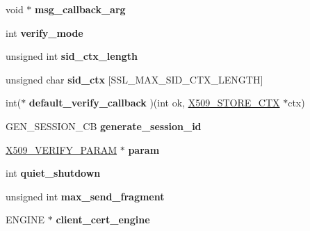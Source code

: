 \begin{DoxyCompactItemize}
\item 
\mbox{\label{structssl__ctx__st_ad1aba043a97ea40fcb8a39e65698f8c0}} 
void $\ast$ {\bfseries msg\+\_\+callback\+\_\+arg}
\item 
\mbox{\label{structssl__ctx__st_a31f82e30439244c12f51daff24fd40d8}} 
int {\bfseries verify\+\_\+mode}
\item 
\mbox{\label{structssl__ctx__st_a59afab8285fbc901d590ab6edaa75bd0}} 
unsigned int {\bfseries sid\+\_\+ctx\+\_\+length}
\item 
\mbox{\label{structssl__ctx__st_a92f94c2a4612e04ec3c075c76aae5553}} 
unsigned char {\bfseries sid\+\_\+ctx} \mbox{[}S\+S\+L\+\_\+\+M\+A\+X\+\_\+\+S\+I\+D\+\_\+\+C\+T\+X\+\_\+\+L\+E\+N\+G\+TH\mbox{]}
\item 
\mbox{\label{structssl__ctx__st_aa6c4ede4479002d346cee1bb1be14a46}} 
int($\ast$ {\bfseries default\+\_\+verify\+\_\+callback} )(int ok, \hyperlink{structx509__store__ctx__st}{X509\+\_\+\+S\+T\+O\+R\+E\+\_\+\+C\+TX} $\ast$ctx)
\item 
\mbox{\label{structssl__ctx__st_a4485f799f50830d69fa26e7514b032dc}} 
G\+E\+N\+\_\+\+S\+E\+S\+S\+I\+O\+N\+\_\+\+CB {\bfseries generate\+\_\+session\+\_\+id}
\item 
\mbox{\label{structssl__ctx__st_a27c15c2ea4e216baacb44a5bf166cfa1}} 
\hyperlink{struct_x509___v_e_r_i_f_y___p_a_r_a_m__st}{X509\+\_\+\+V\+E\+R\+I\+F\+Y\+\_\+\+P\+A\+R\+AM} $\ast$ {\bfseries param}
\item 
\mbox{\label{structssl__ctx__st_a325f28f265dae1b20da7c813e41bdb96}} 
int {\bfseries quiet\+\_\+shutdown}
\item 
\mbox{\label{structssl__ctx__st_aab1f54a0e69246d749a6f6ad249c2176}} 
unsigned int {\bfseries max\+\_\+send\+\_\+fragment}
\item 
\mbox{\label{structssl__ctx__st_ae6bb617a63017d5c8e7eccc6f8030185}} 
E\+N\+G\+I\+NE $\ast$ {\bfseries client\+\_\+cert\+\_\+engine}

\end{DoxyCompactItemize}
